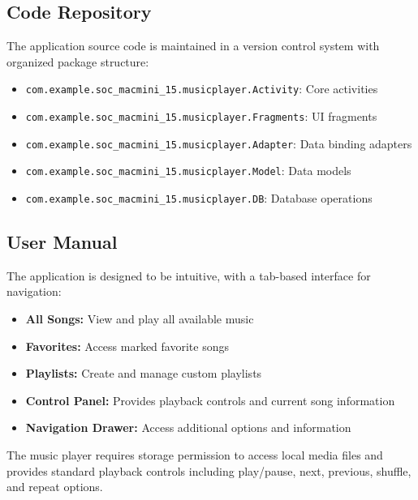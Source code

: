 \documentclass{article}
\begin{document}
\subsection{Code Repository}
The application source code is maintained in a version control system with organized package structure:
\begin{itemize}
    \item \texttt{com.example.soc\_macmini\_15.musicplayer.Activity}: Core activities
    \item \texttt{com.example.soc\_macmini\_15.musicplayer.Fragments}: UI fragments
    \item \texttt{com.example.soc\_macmini\_15.musicplayer.Adapter}: Data binding adapters
    \item \texttt{com.example.soc\_macmini\_15.musicplayer.Model}: Data models
    \item \texttt{com.example.soc\_macmini\_15.musicplayer.DB}: Database operations
\end{itemize}

\subsection{User Manual}
The application is designed to be intuitive, with a tab-based interface for navigation:
\begin{itemize}
    \item \textbf{All Songs:} View and play all available music
    \item \textbf{Favorites:} Access marked favorite songs
    \item \textbf{Playlists:} Create and manage custom playlists
    \item \textbf{Control Panel:} Provides playback controls and current song information
    \item \textbf{Navigation Drawer:} Access additional options and information
\end{itemize}

The music player requires storage permission to access local media files and provides standard playback controls including play/pause, next, previous, shuffle, and repeat options.
\end{document}
